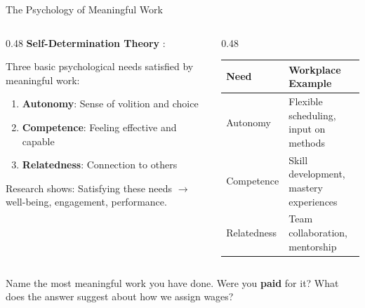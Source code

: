 ﻿\documentclass[aspectratio=169,11pt]{beamer}
\begin{document}
\begin{frame}[shrink=8]{The Psychology of Meaningful Work}
\begin{columns}[T]
\begin{column}{0.48\textwidth}
\textbf{Self-Determination Theory} \parencite{ryan_deci_sdt}:

Three basic psychological needs satisfied by meaningful work:

\vspace{0.2em}
\begin{enumerate}
    \item \textbf{Autonomy}: Sense of volition and choice
    \item \textbf{Competence}: Feeling effective and capable
    \item \textbf{Relatedness}: Connection to others
\end{enumerate}

\vspace{0.2em}
Research shows: Satisfying these needs $\rightarrow$ well-being, engagement, performance.
\end{column}
\begin{column}{0.48\textwidth}
\begin{table}[h]
\centering
\scriptsize
\begin{tabular}{@{}p{1.8cm}p{3.5cm}@{}}
\toprule
\textbf{Need} & \textbf{Workplace Example} \\
\midrule
Autonomy & Flexible scheduling, input on methods \\
\addlinespace
Competence & Skill development, mastery experiences \\
\addlinespace
Relatedness & Team collaboration, mentorship \\
\bottomrule
\end{tabular}
\end{table}
\end{column}
\end{columns}

\begin{discussionbox}[Discussion]
Name the most meaningful work you have done. Were you \textbf{paid} for it? What does the answer suggest about how we assign wages?
\end{discussionbox}
\end{frame}
\end{document}
